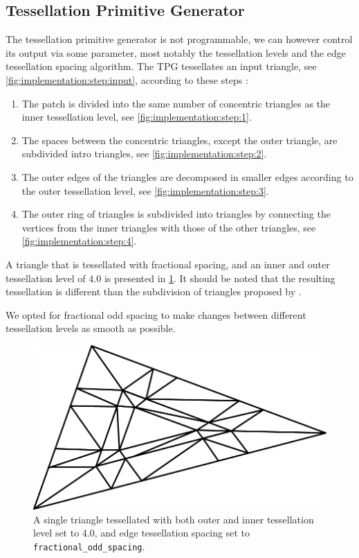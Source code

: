 \subsection{Tessellation Primitive Generator}
\label{ss:implementation:tpg}
	The tessellation primitive generator is not programmable, we can however control its output via some parameter, most notably the tessellation levels and the edge tessellation spacing algorithm. The TPG tessellates an input triangle, see \cref{fig:implementation:step:input}, according to these steps \cite{cozzi2012opengl}:
		\begin{enumerate}[label=(\roman*)]
			\item \label{it:implementation:1} The patch is divided into the same number of concentric triangles as the inner tessellation level, see \cref{fig:implementation:step:1}.
			\item \label{it:implementation:2} The spaces between the concentric triangles, except the outer triangle, are subdivided intro triangles, see \cref{fig:implementation:step:2}.
			\item \label{it:implementation:3} The outer edges of the triangles are decomposed in smaller edges according to the outer tessellation level, see \cref{fig:implementation:step:3}.
			\item \label{it:implementation:4} The outer ring of triangles is subdivided into triangles by connecting the vertices from the inner triangles with those of the other triangles, see \cref{fig:implementation:step:4}.
		\end{enumerate}
	A triangle that is tessellated with fractional spacing, and an inner and outer tessellation level of $4.0$ is presented in \cref{fig:implementation:tessellatedTriangle}. It should be noted that the resulting tessellation is different than the subdivision of triangles proposed by \citeauthor{vlachos2001curved}. 

	We opted for fractional odd spacing to make changes between different tessellation levels as smooth as possible. 

	\begin{figure}
		\centering
		\includegraphics[width=\columnwidth]{content/img/implementation/tessellatedTriangle.png}
		\caption{A single triangle tessellated with both outer and inner tessellation level set to 4.0, and edge tessellation spacing set to \texttt{fractional\_odd\_spacing}.}
		\label{fig:implementation:tessellatedTriangle}
	\end{figure}

